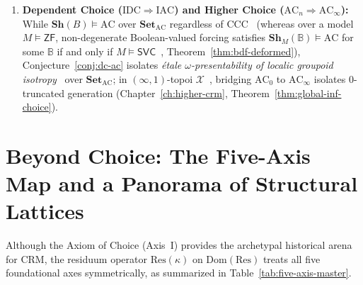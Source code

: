 \documentclass[10pt,twoside,openright]{book}
\theoremstyle{crmplain}
\theoremstyle{crmdef}
\theoremstyle{crmremark}
\begin{document}
\begin{enumerate}[label=\textbf{\arabic*.},leftmargin=1.8em]
  \item \textbf{Dependent Choice ($\mathrm{IDC} \Rightarrow \mathrm{IAC}$) and Higher Choice ($\mathrm{AC}_n \Rightarrow \mathrm{AC}_\infty$):} While $\mathbf{Sh}(B) \models \mathrm{AC}$ over $\mathbf{Set}_{\mathrm{AC}}$ regardless of $\mathrm{CCC}$~\cite{Barr74,Johnstone02} (whereas over a model $M \models \mathsf{ZF}$, non-degenerate Boolean-valued forcing satisfies $\mathbf{Sh}_M(\mathbb{B}) \models \mathrm{AC}$ for some $\mathbb{B}$ if and only if $M \models \mathsf{SVC}$~\cite{Blass79,Usuba21}, Theorem~\ref{thm:bdf-deformed}), Conjecture~\ref{conj:dc-ac} isolates \emph{\'etale $\omega$-presentability of localic groupoid isotropy}~\cite{Johnstone02,Kihara26} over $\mathbf{Set}_{\mathrm{AC}}$; in $(\infty, 1)$-topoi $\mathcal{X}$~\cite{Lurie09}, bridging $\mathrm{AC}_0$ to $\mathrm{AC}_\infty$ isolates $0$-truncated generation (Chapter~\ref{ch:higher-crm}, Theorem~\ref{thm:global-inf-choice}).
\end{enumerate}

\section{Beyond Choice: The Five-Axis Map and a Panorama of Structural Lattices}

Although the Axiom of Choice (Axis~I) provides the archetypal historical arena for $\mathrm{CRM}$, the residuum operator $\mathrm{Res}(\kappa)$ on $\mathrm{Dom}(\mathrm{Res})$ treats all five foundational axes symmetrically, as summarized in Table~\ref{tab:five-axis-master}.
\end{document}
